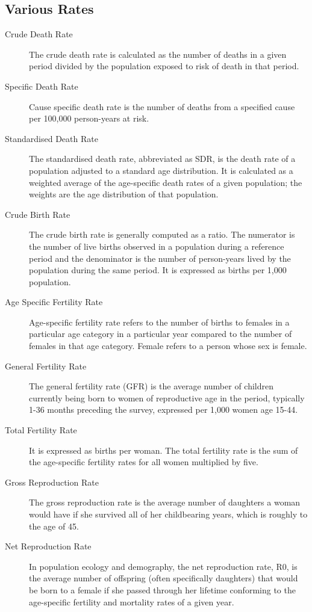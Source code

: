 \documentclass[
10pt, %
a4paper, %
]{report}
\begin{document}
\subsection{Various Rates}
\begin{description}
\item[Crude Death Rate] The crude death rate is calculated as the number of deaths in a given period divided by the population exposed to risk of death in that period.
\item[Specific Death Rate] Cause specific death rate is the number of deaths from a specified cause per 100,000 person-years at risk.
\item[Standardised Death Rate] The standardised death rate, abbreviated as SDR, is the death rate of a population adjusted to a standard age distribution. It is calculated as a weighted average of the age-specific death rates of a given population; the weights are the age distribution of that population.
\item[Crude Birth Rate] The crude birth rate is generally computed as a ratio. The numerator is the number of  live births observed in a population during a reference period and the denominator is  the number of person-years lived by the population during the same period. It is expressed as births per 1,000 population.
\item[Age Specific Fertility Rate] Age-specific fertility rate refers to the number of births to females in a particular age category in a particular year compared to the number of females in that age category. Female refers to a person whose sex is female.
\item[General Fertility Rate] The general fertility rate (GFR) is the average number of children currently being born to women of reproductive age in the period, typically 1-36 months preceding the survey, expressed per 1,000 women age 15-44.
\item[Total Fertility Rate] It is expressed as births per woman. The total fertility rate is the sum of the age-specific fertility rates for all women multiplied by five.
\item[Gross Reproduction Rate] The gross reproduction rate is the average number of daughters a woman would have if she survived all of her childbearing years, which is roughly to the age of 45.
\item[Net Reproduction Rate]
In population ecology and demography, the net reproduction rate, R0, is the average number of offspring (often specifically daughters) that would be born to a female if she passed through her lifetime conforming to the age-specific fertility and mortality rates of a given year.
\end{description}
\end{document}
